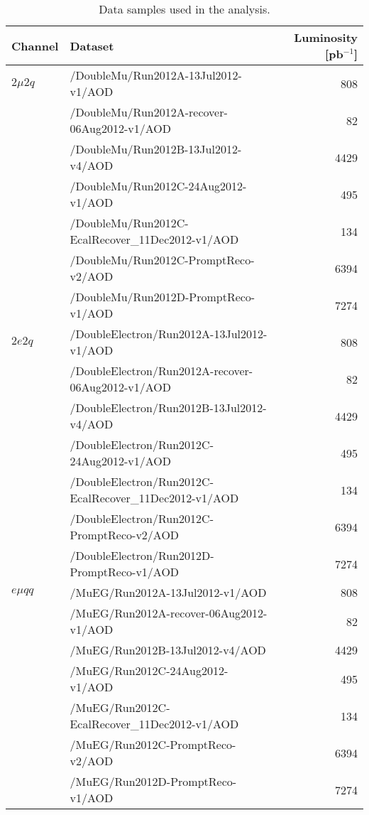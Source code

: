 \begin{table}
\caption{Data samples used in the analysis.}
\label{table-data}
\vspace{\medskipamount}
\begin{center}
\footnotesize
\begin{tabular}{|l|l|r|}
\hline
Channel & Dataset & Luminosity [pb$^{-1}$] \\
\hline
$2\mu2q$ & /DoubleMu/Run2012A-13Jul2012-v1/AOD & 808\\
         & /DoubleMu/Run2012A-recover-06Aug2012-v1/AOD & 82\\
         & /DoubleMu/Run2012B-13Jul2012-v4/AOD & 4429 \\
         & /DoubleMu/Run2012C-24Aug2012-v1/AOD & 495 \\
         & /DoubleMu/Run2012C-EcalRecover\_11Dec2012-v1/AOD & 134\\
         & /DoubleMu/Run2012C-PromptReco-v2/AOD & 6394\\
         & /DoubleMu/Run2012D-PromptReco-v1/AOD & 7274\\
\hline 
$2e2q$   & /DoubleElectron/Run2012A-13Jul2012-v1/AOD & 808\\
         & /DoubleElectron/Run2012A-recover-06Aug2012-v1/AOD & 82\\
         & /DoubleElectron/Run2012B-13Jul2012-v4/AOD & 4429\\
         & /DoubleElectron/Run2012C-24Aug2012-v1/AOD & 495\\
         & /DoubleElectron/Run2012C-EcalRecover\_11Dec2012-v1/AOD & 134\\
         & /DoubleElectron/Run2012C-PromptReco-v2/AOD & 6394\\
         & /DoubleElectron/Run2012D-PromptReco-v1/AOD & 7274\\
\hline 
$e\mu qq$& /MuEG/Run2012A-13Jul2012-v1/AOD & 808\\
         & /MuEG/Run2012A-recover-06Aug2012-v1/AOD & 82\\
         & /MuEG/Run2012B-13Jul2012-v4/AOD & 4429\\
         & /MuEG/Run2012C-24Aug2012-v1/AOD & 495\\
         & /MuEG/Run2012C-EcalRecover\_11Dec2012-v1/AOD & 134\\
         & /MuEG/Run2012C-PromptReco-v2/AOD & 6394\\
         & /MuEG/Run2012D-PromptReco-v1/AOD & 7274\\
\hline
\end{tabular}
\end{center}
\end{table}

